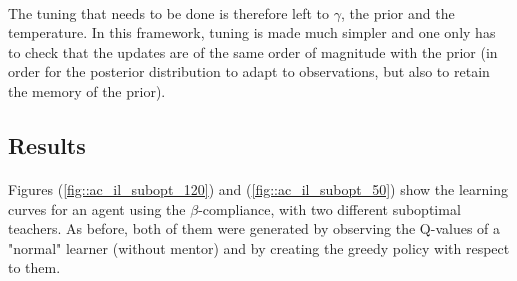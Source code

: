 \documentclass[a4paper]{report}
\begin{document}
{{{{			\paragraph{} The tuning that needs to be done is therefore left to $\gamma$, the prior and the temperature. In this framework, tuning is made much simpler and one only has to check that the updates are of the same order of magnitude with the prior (in order for the posterior distribution to adapt to observations, but also to retain the memory of the prior). 
			}
			\subsection{Results}
			{
				\paragraph{} Figures (\ref{fig::ac_il_subopt_120}) and (\ref{fig::ac_il_subopt_50}) show the learning curves for an agent using the $\beta$-compliance, with two different suboptimal teachers. As before, both of them were generated by observing the Q-values of a "normal" learner (without mentor) and by creating the greedy policy with respect to them.  
				
}}}}
\end{document}
